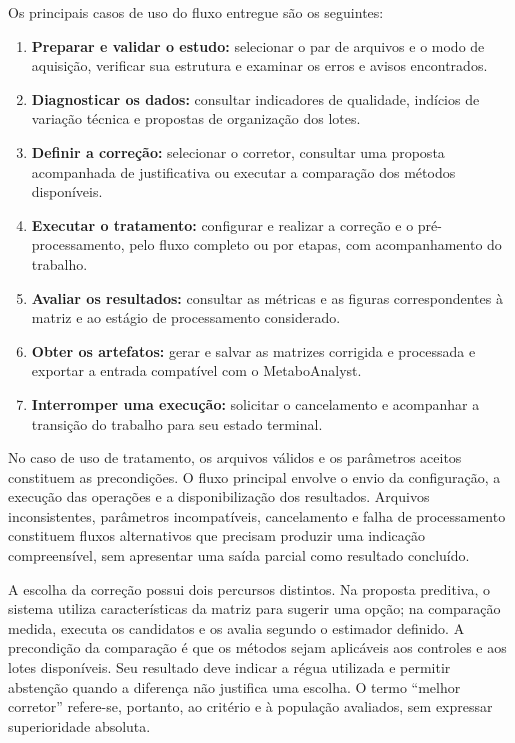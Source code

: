 Os principais casos de uso do fluxo entregue são os seguintes:
\begin{enumerate}
\item \textbf{Preparar e validar o estudo:} selecionar o par de arquivos e o modo de aquisição, verificar sua estrutura e examinar os erros e avisos encontrados.
\item \textbf{Diagnosticar os dados:} consultar indicadores de qualidade, indícios de variação técnica e propostas de organização dos lotes.
\item \textbf{Definir a correção:} selecionar o corretor, consultar uma proposta acompanhada de justificativa ou executar a comparação dos métodos disponíveis.
\item \textbf{Executar o tratamento:} configurar e realizar a correção e o pré-processamento, pelo fluxo completo ou por etapas, com acompanhamento do trabalho.
\item \textbf{Avaliar os resultados:} consultar as métricas e as figuras correspondentes à matriz e ao estágio de processamento considerado.
\item \textbf{Obter os artefatos:} gerar e salvar as matrizes corrigida e processada e exportar a entrada compatível com o MetaboAnalyst.
\item \textbf{Interromper uma execução:} solicitar o cancelamento e acompanhar a transição do trabalho para seu estado terminal.
\end{enumerate}

No caso de uso de tratamento, os arquivos válidos e os parâmetros aceitos constituem as precondições. O fluxo principal envolve o envio da configuração, a execução das operações e a disponibilização dos resultados. Arquivos inconsistentes, parâmetros incompatíveis, cancelamento e falha de processamento constituem fluxos alternativos que precisam produzir uma indicação compreensível, sem apresentar uma saída parcial como resultado concluído.

A escolha da correção possui dois percursos distintos. Na proposta preditiva, o sistema utiliza características da matriz para sugerir uma opção; na comparação medida, executa os candidatos e os avalia segundo o estimador definido. A precondição da comparação é que os métodos sejam aplicáveis aos controles e aos lotes disponíveis. Seu resultado deve indicar a régua utilizada e permitir abstenção quando a diferença não justifica uma escolha. O termo ``melhor corretor'' refere-se, portanto, ao critério e à população avaliados, sem expressar superioridade absoluta.

